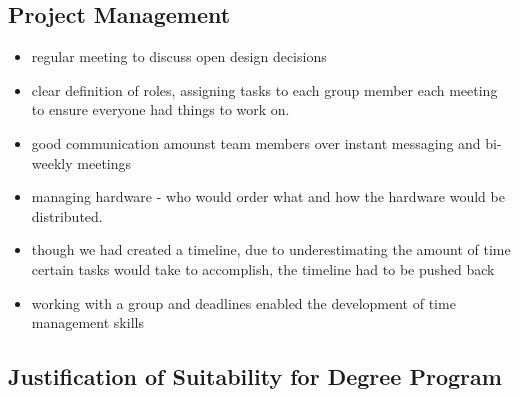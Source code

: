 \subsection{Project Management}
\begin{itemize}
   \item regular meeting to discuss open design decisions
   \item clear definition of roles, assigning tasks to each group member each meeting to ensure everyone had things to work on.
   \item good communication amounst team members over instant messaging and bi-weekly meetings
   \item managing hardware - who would order what and how the hardware would be distributed.
   \item though we had created a timeline, due to underestimating the amount of time certain tasks would take to accomplish, the timeline had to be pushed back
   \item working with a group and deadlines enabled the development of time management skills
\end{itemize}
\subsection{Justification of Suitability for Degree Program}


